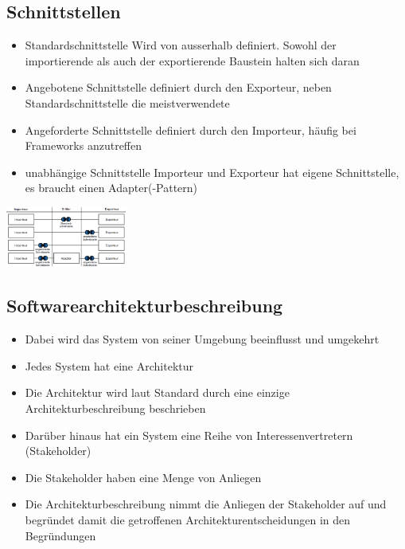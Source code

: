 \documentclass{report}
\newenvironment{Figure}
	{\par\medskip\noindent\minipage{\linewidth}}
	{\endminipage\par\medskip}
\theoremstyle{definition}
\theoremstyle{example}
\begin{document}
\subsection{Schnittstellen}

\begin{itemize}
   \item Standardschnittstelle
   \subitem Wird von ausserhalb definiert. Sowohl der importierende als auch der exportierende Baustein halten sich daran 
   \item Angebotene Schnittstelle
   \subitem definiert durch den Exporteur, neben Standardschnittstelle die meistverwendete 
   \item Angeforderte Schnittstelle
   \subitem definiert durch den Importeur, häufig bei Frameworks anzutreffen
   \item unabhängige Schnittstelle
   \subitem Importeur und Exporteur hat eigene Schnittstelle, es braucht einen Adapter(-Pattern)  
\end{itemize}

\begin{Figure}
   \centering
    \includegraphics[width=150px]{img/Schnittstellen.png}
        \label{fig:Abbildung Schnittstellenvarianten}
\end{Figure}

\subsection{Softwarearchitekturbeschreibung}
\begin{itemize}
   \item Dabei wird das System von seiner Umgebung beeinflusst und umgekehrt
   \item Jedes System hat eine Architektur
   \item Die Architektur wird laut Standard durch eine einzige Architekturbeschreibung beschrieben
   \item Darüber hinaus hat ein System eine Reihe von Interessenvertretern (Stakeholder)
   \item Die Stakeholder haben eine Menge von Anliegen
   \item Die Architekturbeschreibung nimmt die Anliegen der Stakeholder auf und begründet damit die getroffenen Architekturentscheidungen in den Begründungen
\end{itemize}
\end{document}
